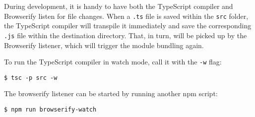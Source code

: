 During development, it is handy to have both the TypeScript compiler and Browserify listen for file changes. When a \texttt{.ts} file is saved within the \texttt{src} folder, the TypeScript compiler will transpile it immediately and save the corresponding \texttt{.js} file within the destination directory. That, in turn, will be picked up by the Browserify listener, which will trigger the module bundling again.

To run the TypeScript compiler in watch mode, call it with the \texttt{-w} flag:

\begin{verbatim}
$ tsc -p src -w
\end{verbatim}

The browserify listener can be started by running another npm script:

\begin{verbatim}
$ npm run browserify-watch
\end{verbatim}

